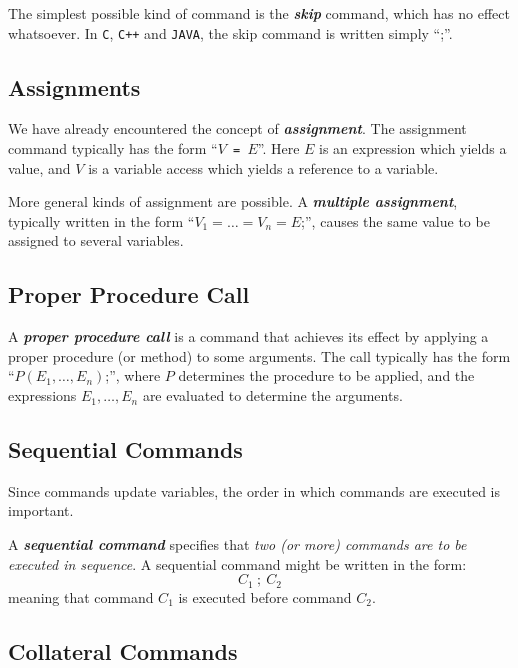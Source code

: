 The simplest possible kind of command is the \textit{\textbf{skip}} command, which has no effect whatsoever. In \texttt{C}, \texttt{C++} and \texttt{JAVA}, the skip command is written simply ``;''.

\newpage

\subsection{Assignments}
\label{sec:assignments}

We have already encountered the concept of \textit{\textbf{assignment}}. The assignment command typically has the form ``\texttt{$V$ = $E$}''. Here $E$ is an expression which yields a value, and $V$ is a variable access which yields a reference to a variable.

More general kinds of assignment are possible. A \textit{\textbf{multiple assignment}}, typically written in the form ``$V_1 = \ldots = V_n = E$;'', causes the same value to be assigned to several variables.

\subsection{Proper Procedure Call}
\label{sec:proper-procedure-call}

A \textit{\textbf{proper procedure call}} is a command that achieves its effect by applying a proper procedure (or method) to some arguments. The call typically has the form ``$P(E_1, \ldots, E_n)$;'', where $P$ determines the procedure to be applied, and the expressions $E_1, \ldots, E_n$ are evaluated to determine the arguments.

\subsection{Sequential Commands}
\label{sec:seq-com}

Since commands update variables, the order in which commands are executed
is important. 

A \textit{\textbf{sequential command}} specifies that \textit{two (or more) commands are to be executed in sequence}. A sequential command might be written in the form:
\begin{equation*}
  C_1\ ;\ C_2
\end{equation*}
meaning that command $C_1$ is executed before command $C_2$.

\subsection{Collateral Commands}
\label{sec:col-com}


